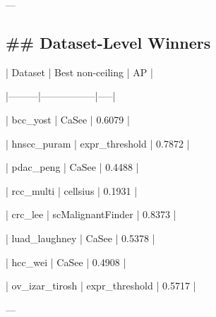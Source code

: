 \documentclass[11pt]{article}
\begin{document}
---

\subsection*{\#\# Dataset-Level Winners}
| Dataset | Best non-ceiling | AP |

|---------|-----------------|-----|

| bcc\_yost | CaSee | 0.6079 |

| hnscc\_puram | expr\_threshold | 0.7872 |

| pdac\_peng | CaSee | 0.4488 |

| rcc\_multi | cellsius | 0.1931 |

| crc\_lee | scMalignantFinder | 0.8373 |

| luad\_laughney | CaSee | 0.5378 |

| hcc\_wei | CaSee | 0.4908 |

| ov\_izar\_tirosh | expr\_threshold | 0.5717 |

---
\end{document}
